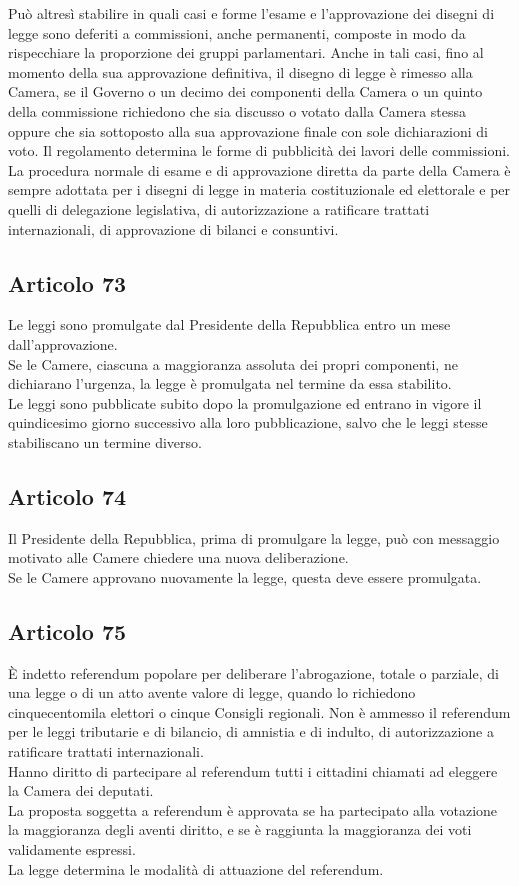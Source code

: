 \documentclass{article}
\newcommand{\articolo}[1]{
	\subsection*{Articolo #1}
}
\begin{document}
Può altresì stabilire in quali casi e forme l’esame e l’approvazione dei disegni di legge sono deferiti a commissioni, anche permanenti, composte in modo da rispecchiare la proporzione dei gruppi parlamentari. Anche in tali casi, fino al momento della sua approvazione definitiva, il disegno di legge è rimesso alla Camera, se il Governo o un decimo dei componenti della Camera o un quinto della commissione richiedono che sia discusso o votato dalla Camera stessa oppure che sia sottoposto alla sua approvazione finale con sole dichiarazioni di voto. Il regolamento determina le forme di pubblicità dei lavori delle commissioni.\\
La procedura normale di esame e di approvazione diretta da parte della Camera è sempre adottata per i disegni di legge in materia costituzionale ed elettorale e per quelli di delegazione legislativa, di autorizzazione a ratificare trattati internazionali, di approvazione di bilanci e consuntivi.
\articolo{73}
Le leggi sono promulgate dal Presidente della Repubblica entro un mese dall’approvazione.\\
Se le Camere, ciascuna a maggioranza assoluta dei propri componenti, ne dichiarano l’urgenza, la legge è promulgata nel termine da essa stabilito.\\
Le leggi sono pubblicate subito dopo la promulgazione ed entrano in vigore il quindicesimo giorno successivo alla loro pubblicazione, salvo che le leggi stesse stabiliscano un termine diverso.
\articolo{74}
Il Presidente della Repubblica, prima di promulgare la legge, può con messaggio motivato alle Camere chiedere una nuova deliberazione.\\
Se le Camere approvano nuovamente la legge, questa deve essere promulgata.
\articolo{75}
È indetto referendum popolare per deliberare l’abrogazione, totale o parziale, di una legge o di un atto avente valore di legge, quando lo richiedono cinquecentomila elettori o cinque Consigli regionali.
Non è ammesso il referendum per le leggi tributarie e di bilancio, di amnistia e di indulto, di autorizzazione a ratificare trattati internazionali.\\
Hanno diritto di partecipare al referendum tutti i cittadini chiamati ad eleggere la Camera dei deputati.\\
La proposta soggetta a referendum è approvata se ha partecipato alla votazione la maggioranza degli aventi diritto, e se è raggiunta la maggioranza dei voti validamente espressi.\\
La legge determina le modalità di attuazione del referendum.
\end{document}
